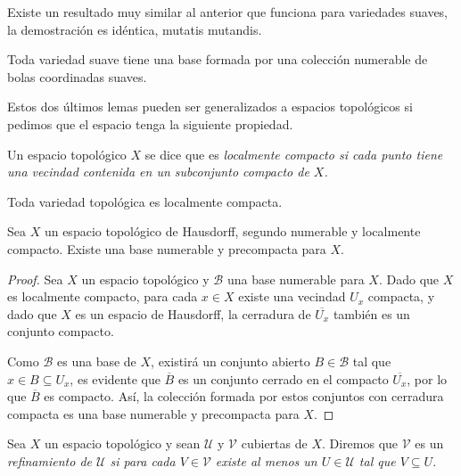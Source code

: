 Existe un resultado muy similar al anterior que funciona para variedades suaves, la demostración es idéntica, mutatis mutandis.

\begin{lemma}\label{Lemma: Base Por Bolas Suaves}
	Toda variedad suave tiene una base formada por una colección numerable de bolas coordinadas suaves.
\end{lemma}

Estos dos últimos lemas pueden ser generalizados a espacios topológicos si pedimos que el espacio tenga la siguiente propiedad.

\begin{definition}
	Un espacio topológico $X$ se dice que es \it{localmente compacto} si cada punto tiene una vecindad contenida en un subconjunto compacto de $X$.
\end{definition}

\begin{corollary}
	Toda variedad topológica es localmente compacta.
\end{corollary}

\begin{lemma}
	Sea $X$ un espacio topológico de Hausdorff, segundo numerable y localmente compacto. Existe una base numerable y precompacta para $X$.
\end{lemma}

\begin{proof}
	Sea $X$ un espacio topológico y $\mathcal{B}$ una base numerable para $X$. Dado que $X$ es localmente compacto, para cada $x \in X$ existe una vecindad $U_x$ compacta, y dado que $X$ es un espacio de Hausdorff, la cerradura de $\overline{U_x}$ también es un conjunto compacto.

	Como $\mathcal{B}$ es una base de $X$, existirá un conjunto abierto $B \in \mathcal{B}$ tal que $x \in B \subseteq U_x$, es evidente que $\overline{B}$ es un conjunto cerrado en el compacto $\overline{U_x}$, por lo que $\overline{B}$ es compacto. Así, la colección formada por estos conjuntos con cerradura compacta es una base numerable y precompacta para $X$.
\end{proof}


\begin{definition}[Refinamiento]\label{Definición: Refinamiento}
	Sea $X$ un espacio topológico y sean $\mathcal{U}$ y $\mathcal{V}$ cubiertas de $X$. Diremos que $\mathcal{V}$ es un \it{refinamiento de $\mathcal{U}$} si para cada $V \in \mathcal{V}$ existe al menos un $U \in \mathcal{U}$ tal que $V \subseteq U$.
\end{definition}

